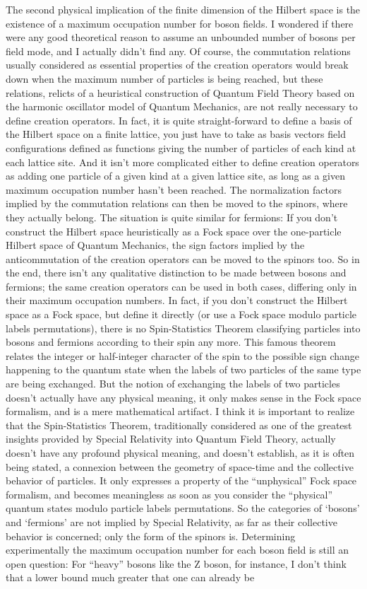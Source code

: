 The second physical implication of the finite dimension of the Hilbert space is the existence of a maximum occupation number for boson fields. I wondered if there were any good theoretical reason to assume an unbounded number of bosons per field mode, and I actually didn't find any. Of course, the commutation relations usually considered as essential properties of the creation operators would break down when the maximum number of particles is being reached, but these relations, relicts of a heuristical construction of Quantum Field Theory based on the harmonic oscillator model of Quantum Mechanics, are not really necessary to define creation operators. In fact, it is quite straight-forward to define a basis of the Hilbert space on a finite lattice, you just have to take as basis vectors field configurations defined as functions giving the number of particles of each kind at each lattice site. And it isn't more complicated either to define creation operators as adding one particle of a given kind at a given lattice site, as long as a given maximum occupation number hasn't been reached. The normalization factors implied by the commutation relations can then be moved to the spinors, where they actually belong. The situation is quite similar for fermions: If you don't construct the Hilbert space heuristically as a Fock space over the one-particle Hilbert space of Quantum Mechanics, the sign factors implied by the anticommutation of the creation operators can be moved to the spinors too. So in the end, there isn't any qualitative distinction to be made between bosons and fermions; the same creation operators can be used in both cases, differing only in their maximum occupation numbers. In fact, if you don't construct the Hilbert space as a Fock space, but define it directly (or use a Fock space modulo particle labels permutations), there is no Spin-Statistics Theorem classifying particles into bosons and fermions according to their spin any more. This famous theorem relates the integer or half-integer character of the spin to the possible sign change happening to the quantum state when the labels of two particles of the same type are being exchanged. But the notion of exchanging the labels of two particles doesn't actually have any physical meaning, it only makes sense in the Fock space formalism, and is a mere mathematical artifact. I think it is important to realize that the Spin-Statistics Theorem, traditionally considered as one of the greatest insights provided by Special Relativity into Quantum Field Theory, actually doesn't have any profound physical meaning, and doesn't establish, as it is often being stated, a connexion between the geometry of space-time and the collective behavior of particles. It only expresses a property of the ``unphysical'' Fock space formalism, and becomes meaningless as soon as you consider the ``physical'' quantum states modulo particle labels permutations. So the categories of `bosons' and `fermions' are not implied by Special Relativity, as far as their collective behavior is concerned; only the form of the spinors is. Determining experimentally the maximum occupation number for each boson field is still an open question: For ``heavy'' bosons like the Z boson, for instance, I don't think that a lower bound much greater that one can already be 